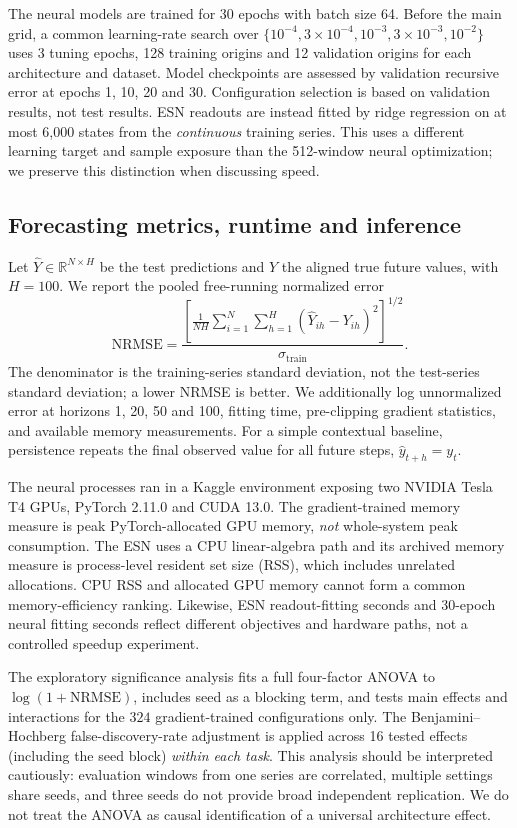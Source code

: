 \documentclass[final,5p,times,twocolumn]{elsarticle}
\begin{document}
The neural models are trained for 30 epochs with batch size 64. Before the main grid, a common learning-rate search over $\{10^{-4},3\times10^{-4},10^{-3},3\times10^{-3},10^{-2}\}$ uses 3 tuning epochs, 128 training origins and 12 validation origins for each architecture and dataset. Model checkpoints are assessed by validation recursive error at epochs 1, 10, 20 and 30. Configuration selection is based on validation results, not test results. ESN readouts are instead fitted by ridge regression on at most 6,000 states from the \emph{continuous} training series. This uses a different learning target and sample exposure than the 512-window neural optimization; we preserve this distinction when discussing speed.

\subsection{Forecasting metrics, runtime and inference}
Let $\widehat{Y}\in\mathbb{R}^{N\times H}$ be the test predictions and $Y$ the aligned true future values, with $H=100$. We report the pooled free-running normalized error
\begin{equation}
 \mathrm{NRMSE}=\frac{\left[\frac{1}{NH}\sum_{i=1}^{N}\sum_{h=1}^{H}(\widehat{Y}_{ih}-Y_{ih})^2\right]^{1/2}}{\sigma_{\mathrm{train}}}.
 \label{eq:nrmse}
\end{equation}
The denominator is the training-series standard deviation, not the test-series standard deviation; a lower NRMSE is better. We additionally log unnormalized error at horizons 1, 20, 50 and 100, fitting time, pre-clipping gradient statistics, and available memory measurements. For a simple contextual baseline, persistence repeats the final observed value for all future steps, $\widehat y_{t+h}=y_t$.

The neural processes ran in a Kaggle environment exposing two NVIDIA Tesla T4 GPUs, PyTorch 2.11.0 and CUDA 13.0. The gradient-trained memory measure is peak PyTorch-allocated GPU memory, \emph{not} whole-system peak consumption. The ESN uses a CPU linear-algebra path and its archived memory measure is process-level resident set size (RSS), which includes unrelated allocations. CPU RSS and allocated GPU memory cannot form a common memory-efficiency ranking. Likewise, ESN readout-fitting seconds and 30-epoch neural fitting seconds reflect different objectives and hardware paths, not a controlled speedup experiment.

The exploratory significance analysis fits a full four-factor ANOVA to $\log(1+\mathrm{NRMSE})$, includes seed as a blocking term, and tests main effects and interactions for the $324$ gradient-trained configurations only. The Benjamini--Hochberg false-discovery-rate adjustment is applied across 16 tested effects (including the seed block) \emph{within each task}. This analysis should be interpreted cautiously: evaluation windows from one series are correlated, multiple settings share seeds, and three seeds do not provide broad independent replication. We do not treat the ANOVA as causal identification of a universal architecture effect.
\end{document}
